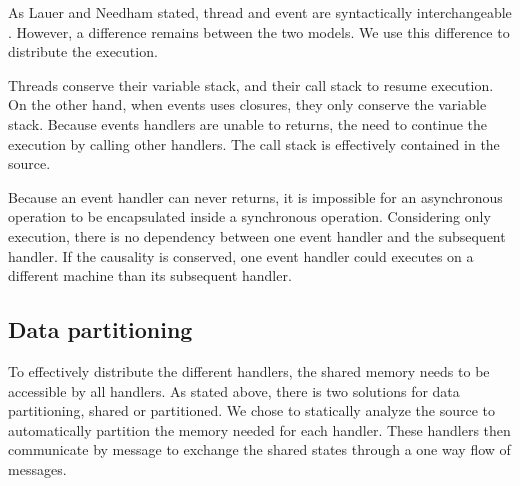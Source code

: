 As Lauer and Needham stated, thread and event are syntactically interchangeable \cite{Lauer1979}.
However, a difference remains between the two models.
We use this difference to distribute the execution.

Threads conserve their variable stack, and their call stack to resume execution.
On the other hand, when events uses closures, they only conserve the variable stack.
Because events handlers are unable to returns, the need to continue the execution by calling other handlers.
The call stack is effectively contained in the source.

Because an event handler can never returns, it is impossible for an asynchronous operation to be encapsulated inside a synchronous operation.
Considering only execution, there is no dependency between one event handler and the subsequent handler.
If the causality is conserved, one event handler could executes on a different machine than its subsequent handler.

\subsection{Data partitioning}

To effectively distribute the different handlers, the shared memory needs to be accessible by all handlers.
As stated above, there is two solutions for data partitioning, shared or partitioned.
We chose to statically analyze the source to automatically partition the memory needed for each handler.
These handlers then communicate by message to exchange the shared states through a one way flow of messages.